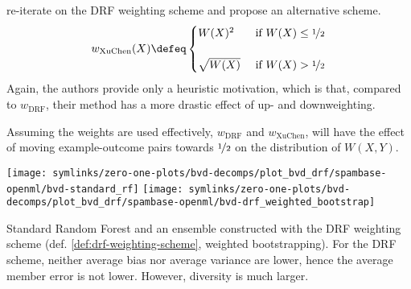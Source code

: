 \documentclass[../main.tex]{subfiles}
\begin{document}

\citeauthor{xu_ImplementationPerformanceOptimization_2017} \cite{xu_ImplementationPerformanceOptimization_2017} re-iterate on the DRF weighting scheme and propose an alternative scheme.
$$
w_{\text{XuChen}}(X) \defeq \begin{cases}
W(X)^2 & \text{~if~} W(X) \leq \nicefrac{1}{2} \\ \\
\sqrt{W(X)} & \text{~if~} W(X) > \nicefrac{1}{2}
\end{cases}
$$
Again, the authors provide only a heuristic motivation, which is that, compared to $w_{\text{DRF}}$, their method has a more drastic effect of up- and downweighting. 

Assuming the weights are used effectively, $w_{\text{DRF}}$ and $w_{\text{XuChen}}$, will have the effect of moving example-outcome pairs towards $\nicefrac{1}{2}$ on the distribution of $W(X,Y)$.

\begin{marginfigure}
    \texttt{[image: symlinks/zero-one-plots/bvd-decomps/plot\_bvd\_drf/spambase-openml/bvd-standard\_rf]}
    \texttt{[image: symlinks/zero-one-plots/bvd-decomps/plot\_bvd\_drf/spambase-openml/bvd-drf\_weighted\_bootstrap]}
    \caption{
        Standard Random Forest and an ensemble constructed with the DRF weighting scheme (def. \ref{def:drf-weighting-scheme}, weighted bootstrapping). For the DRF scheme, neither average bias nor average variance are lower, hence the average member error is not lower. However, diversity is much larger.
    }
    \label{fig:cover-bvd-standard-vs-drf}
\end{marginfigure}
\end{document}
